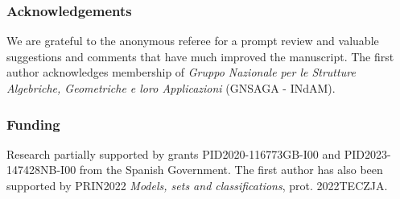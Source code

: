 \documentclass[a4paper, 11pt]{article}
\theoremstyle{note}
\begin{document}
%
% 

\subsubsection*{Acknowledgements} We are grateful to the anonymous referee for a prompt review and valuable suggestions and comments that have much improved the manuscript. The first author acknowledges membership of \textit{Gruppo Nazionale per le Strutture Algebriche, Geometriche e loro Applicazioni} (GNSAGA - INdAM).

\subsubsection*{Funding} Research partially supported by grants PID2020-116773GB-I00 and PID2023-147428NB-I00 from the Spanish Government. The first author has also been supported by PRIN2022 \textit{Models, sets and classifications}, prot. 2022TECZJA.
\end{document}
